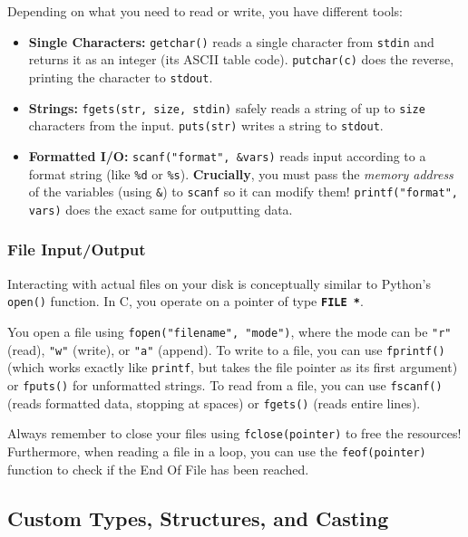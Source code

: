 Depending on what you need to read or write, you have different tools:
\begin{itemize}
    \item[-] \textbf{Single Characters:} \texttt{getchar()} reads a single character from \texttt{stdin} and returns it as an integer (its ASCII table code). \texttt{putchar(c)} does the reverse, printing the character to \texttt{stdout}.
    \item[-] \textbf{Strings:} \texttt{fgets(str, size, stdin)} safely reads a string of up to \texttt{size} characters from the input. \texttt{puts(str)} writes a string to \texttt{stdout}.
    \item[-] \textbf{Formatted I/O:} \texttt{scanf("format", \&vars)} reads input according to a format string (like \texttt{\%d} or \texttt{\%s}). \textbf{Crucially}, you must pass the \textit{memory address} of the variables (using \texttt{\&}) to \texttt{scanf} so it can modify them! \texttt{printf("format", vars)} does the exact same for outputting data.
\end{itemize}



\subsubsection{File Input/Output}

Interacting with actual files on your disk is conceptually similar to Python's \texttt{open()} function. In C, you operate on a pointer of type \textbf{\texttt{FILE *}}. 

You open a file using \texttt{fopen("filename", "mode")}, where the mode can be \texttt{"r"} (read), \texttt{"w"} (write), or \texttt{"a"} (append). 
To write to a file, you can use \texttt{fprintf()} (which works exactly like \texttt{printf}, but takes the file pointer as its first argument) or \texttt{fputs()} for unformatted strings. 
To read from a file, you can use \texttt{fscanf()} (reads formatted data, stopping at spaces) or \texttt{fgets()} (reads entire lines).

Always remember to close your files using \texttt{fclose(pointer)} to free the resources! Furthermore, when reading a file in a loop, you can use the \texttt{feof(pointer)} function to check if the End Of File has been reached.



\subsection{Custom Types, Structures, and Casting}

